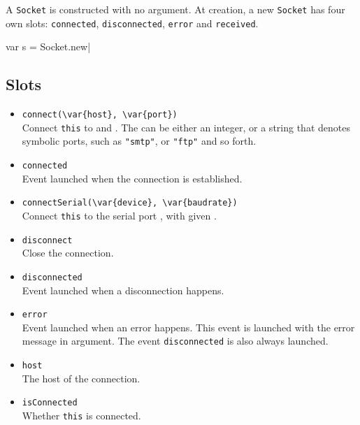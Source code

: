 A \lstinline|Socket| is constructed with no argument. At creation, a
new \lstinline|Socket| has four own slots: \lstinline|connected|,
\lstinline|disconnected|, \lstinline|error| and \lstinline|received|.

\begin{urbiscript}
var s = Socket.new|
\end{urbiscript}

\subsection{Slots}
\begin{itemize}

\item \lstinline|connect(\var{host}, \var{port})|\\
  Connect \lstinline|this| to  and .  The
   can be either an integer, or a string that denotes
  symbolic ports, such as \lstinline|"smtp"|, or \lstinline|"ftp"| and
  so forth.

\item \lstinline|connected|\\
  Event launched when the connection is established.

\item \lstinline|connectSerial(\var{device}, \var{baudrate})|\\
  Connect \lstinline|this| to the serial port , with given
  .

\item \lstinline|disconnect|\\
  Close the connection.

\item \lstinline|disconnected|\\
  Event launched when a disconnection happens.

\item \lstinline|error|\\
  Event launched when an error happens. This event is launched with
  the error message in argument. The event \lstinline|disconnected| is
  also always launched.

\item \lstinline|host|\\
  The host of the connection.

\item \lstinline|isConnected|\\
  Whether \lstinline|this| is connected.


\end{itemize}
